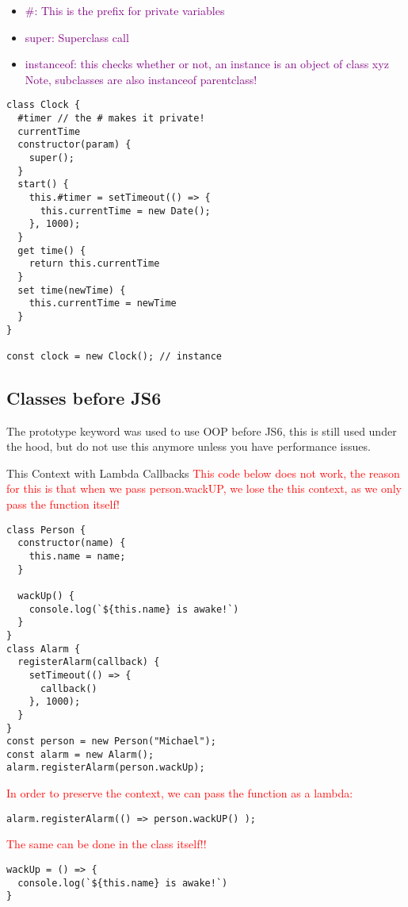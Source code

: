 \documentclass[main.tex,fontsize=6pt,paper=a4,paper=landscape,DIV=calc,]{scrartcl}
\begin{document}
\begin{multicols*}{4}
\begin{itemize}
\item \textcolor{purple}{\#: This is the prefix for private variables}
\item \textcolor{purple}{super: Superclass call}
\item \textcolor{purple}{instanceof: this checks whether or not,\newline
  an instance is an object of class xyz\newline
Note, subclasses are also instanceof parentclass!}
\end{itemize}
\vspace{-2mm}
\begin{lstlisting}
class Clock {
  #timer // the # makes it private!
  currentTime
  constructor(param) {
    super();
  }
  start() {
    this.#timer = setTimeout(() => { 
      this.currentTime = new Date();
    }, 1000);
  }
  get time() {
    return this.currentTime
  }
  set time(newTime) {
    this.currentTime = newTime
  }
}

const clock = new Clock(); // instance
\end{lstlisting}
\vspace{2mm}

\subsection{Classes before JS6}  
The prototype keyword was used to use OOP before JS6, this is still used under the hood, but do not use this anymore unless you have performance issues.

This Context with Lambda Callbacks 
\textcolor{red}{This code below does not work, the reason for this is that when we pass person.wackUP, we lose the this context, as we only pass the function itself!}\newline
\vspace{-2mm}
\begin{lstlisting}
class Person {
  constructor(name) {
    this.name = name;
  }

  wackUp() {
    console.log(`${this.name} is awake!`)
  }
}
class Alarm {
  registerAlarm(callback) {
    setTimeout(() => {
      callback()
    }, 1000);
  }
}
const person = new Person("Michael");
const alarm = new Alarm();
alarm.registerAlarm(person.wackUp);
\end{lstlisting}
\vspace{2mm}
\textcolor{red}{In order to preserve the context, we can pass the function as a lambda:}\newline
\vspace{-2mm}
\begin{lstlisting}
alarm.registerAlarm(() => person.wackUP() );
\end{lstlisting}
\vspace{2mm} 
\textcolor{red}{The same can be done in the class itself!!}\newline
\vspace{-2mm}
\begin{lstlisting}
wackUp = () => {
  console.log(`${this.name} is awake!`)
}
\end{lstlisting}
\vspace{2mm}


\end{multicols*}
\end{document}
